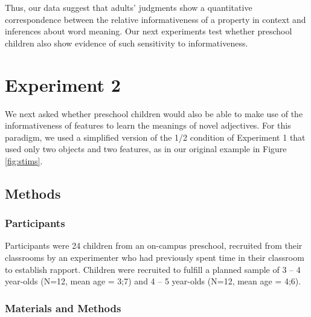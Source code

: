 \documentclass[man,noapacite]{apa2}
\begin{document}

Thus, our data suggest that adults' judgments show a quantitative correspondence between the relative informativeness of a property in context and inferences about word meaning. Our next experiments test whether preschool children also show evidence of such sensitivity to informativeness.


\section{Experiment 2}

We next asked whether preschool children would also be able to make use of the informativeness of features to learn the meanings of novel adjectives. For this paradigm, we used a simplified version of the 1/2 condition of Experiment 1 that used only two objects and two features, as in our original example in Figure \ref{fig:stims}. 

\subsection{Methods}

\subsubsection{Participants}

Participants were 24 children from an on-campus preschool, recruited from their classrooms by an experimenter who had previously spent time in their classroom to establish rapport. Children were recruited to fulfill a planned sample of 3 -- 4 year-olds (N=12, mean age = 3;7) and 4 -- 5 year-olds (N=12, mean age = 4;6). 

\subsubsection{Materials and Methods}
\end{document}
